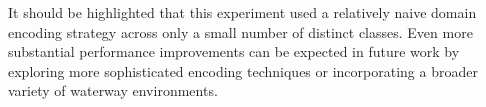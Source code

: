 It should be highlighted that this experiment used a relatively naive domain encoding strategy across only a small number of distinct classes. Even more substantial performance improvements can be expected in future work by exploring more sophisticated encoding techniques or incorporating a broader variety of waterway environments. %

